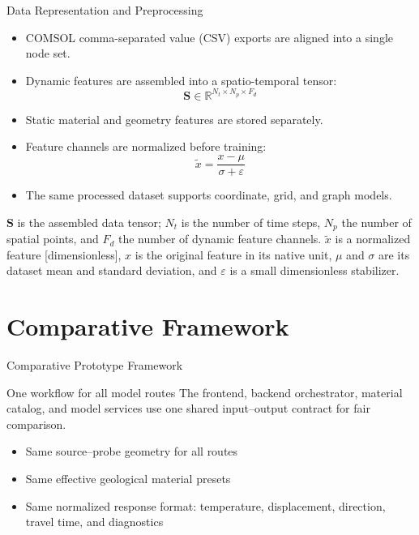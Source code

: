 \documentclass[aspectratio=169,10pt]{beamer}
\begin{document}
\begin{frame}{Data Representation and Preprocessing}
  \begin{itemize}
    \item COMSOL comma-separated value (CSV) exports are aligned into a single node set.
    \item Dynamic features are assembled into a spatio-temporal tensor:
          \[
            \mathbf{S}\in\mathbb{R}^{N_t \times N_p \times F_d}
          \]
    \item Static material and geometry features are stored separately.
    \item Feature channels are normalized before training:
          \[
            \widetilde{x}=\frac{x-\mu}{\sigma+\varepsilon}
          \]
    \item The same processed dataset supports coordinate, grid, and graph models.
  \end{itemize}
  \scriptsize
  $\mathbf{S}$ is the assembled data tensor; $N_t$ is the number of time
  steps, $N_p$ the number of spatial points, and $F_d$ the number of dynamic
  feature channels. $\widetilde{x}$ is a normalized feature [dimensionless],
  $x$ is the original feature in its native unit, $\mu$ and $\sigma$ are its
  dataset mean and standard deviation, and $\varepsilon$ is a small
  dimensionless stabilizer.
\end{frame}

\section{Comparative Framework}

\begin{frame}{Comparative Prototype Framework}
  \begin{block}{One workflow for all model routes}
    The frontend, backend orchestrator, material catalog, and model
    services use one shared input--output contract for fair comparison.
  \end{block}
  \vskip 6pt
  \begin{itemize}
    \item Same source--probe geometry for all routes
    \item Same effective geological material presets
    \item Same normalized response format: temperature, displacement,
          direction, travel time, and diagnostics
  \end{itemize}
\end{frame}
\end{document}
